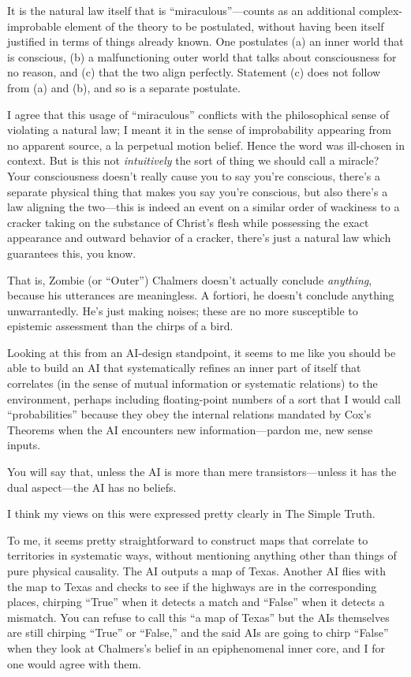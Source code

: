 {
 It is the natural law itself that is
``miraculous''---counts as an
additional complex-improbable element of the theory to be postulated,
without having been itself justified in terms of things already known.
One postulates (a) an inner world that is conscious, (b) a
malfunctioning outer world that talks about consciousness for no
reason, and (c) that the two align perfectly. Statement (c) does not
follow from (a) and (b), and so is a separate postulate.}

{
 I agree that this usage of
``miraculous'' conflicts with the
philosophical sense of violating a natural law; I meant it in the sense
of improbability appearing from no apparent source, a la perpetual
motion belief. Hence the word was ill-chosen in context. But is this
not \textit{intuitively} the sort of thing we should call a miracle?
Your consciousness doesn't really cause you to say
you're conscious, there's a separate
physical thing that makes you say you're conscious, but
also there's a law aligning the two---this is indeed an
event on a similar order of wackiness to a cracker taking on the
substance of Christ's flesh while possessing the exact
appearance and outward behavior of a cracker, there's
just a natural law which guarantees this, you know.}

{
 That is, Zombie (or ``Outer'')
Chalmers doesn't actually conclude \textit{anything},
because his utterances are meaningless. A fortiori, he
doesn't conclude anything unwarrantedly.
He's just making noises; these are no more susceptible
to epistemic assessment than the chirps of a bird.}

{
 Looking at this from an AI-design standpoint, it seems to me like
you should be able to build an AI that systematically refines an inner
part of itself that correlates (in the sense of mutual information or
systematic relations) to the environment, perhaps including
floating-point numbers of a sort that I would call
``probabilities'' because they obey
the internal relations mandated by Cox's Theorems when
the AI encounters new information---pardon me, new sense inputs.}

{
 You will say that, unless the AI is more than mere
transistors---unless it has the dual aspect---the AI has no beliefs.}

{
 I think my views on this were expressed pretty clearly in The
Simple Truth.}

{
 To me, it seems pretty straightforward to construct maps that
correlate to territories in systematic ways, without mentioning
anything other than things of pure physical causality. The AI outputs a
map of Texas. Another AI flies with the map to Texas and checks to see
if the highways are in the corresponding places, chirping
``True'' when it detects a match and
``False'' when it detects a
mismatch. You can refuse to call this ``a map of
Texas'' but the AIs themselves are still chirping
``True'' or
``False,'' and the said AIs are
going to chirp ``False'' when they
look at Chalmers's belief in an epiphenomenal inner
core, and I for one would agree with them.}

